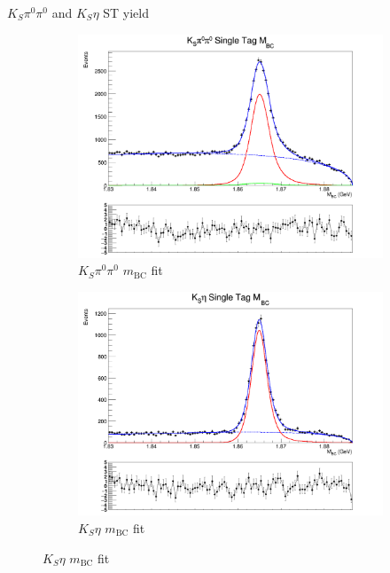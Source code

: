 \documentclass{beamer}
\begin{document}
\begin{frame}{$K_S\pi^0\pi^0$ and $K_S\eta$ ST yield}
  \begin{figure}
    \centering
    \begin{subfigure}{0.5\textwidth}
      \centering
      \includegraphics[width=\textwidth]{KSpi0pi0SingleTagMBCPlot.png}
      \caption{$K_S\pi^0\pi^0$ $m_\text{BC}$ fit}
    \end{subfigure}%
    \begin{subfigure}{0.5\textwidth}
      \centering
      \includegraphics[width=\textwidth]{KSetaSingleTagMBCPlot.png}
      \caption{$K_S\eta$ $m_\text{BC}$ fit}
    \end{subfigure}
  \end{figure}
\end{frame}
\end{document}
